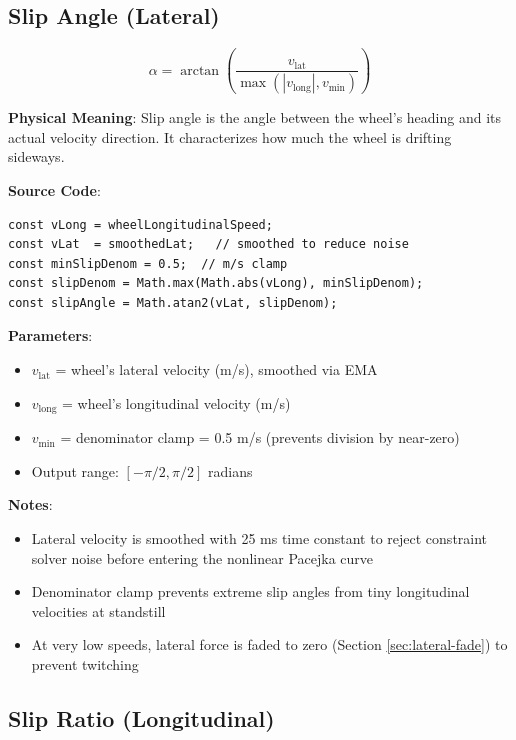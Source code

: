 \subsection{Slip Angle (Lateral)}

\begin{equation}
  \alpha = \arctan\left(\frac{v_{\text{lat}}}{\max(|v_{\text{long}}|, v_{\text{min}})}\right)
  \label{eq:slip-angle}
\end{equation}

\textbf{Physical Meaning}: Slip angle is the angle between the wheel's heading and its actual velocity direction. It characterizes how much the wheel is drifting sideways.

\textbf{Source Code}: 

\begin{lstlisting}[caption={Slip angle computation}]
const vLong = wheelLongitudinalSpeed;
const vLat  = smoothedLat;   // smoothed to reduce noise
const minSlipDenom = 0.5;  // m/s clamp
const slipDenom = Math.max(Math.abs(vLong), minSlipDenom);
const slipAngle = Math.atan2(vLat, slipDenom);
\end{lstlisting}

\textbf{Parameters}:
\begin{itemize}
  \item $v_{\text{lat}}$ = wheel's lateral velocity (m/s), smoothed via EMA
  \item $v_{\text{long}}$ = wheel's longitudinal velocity (m/s)
  \item $v_{\text{min}}$ = denominator clamp = 0.5 m/s (prevents division by near-zero)
  \item Output range: $[-\pi/2, \pi/2]$ radians
\end{itemize}

\textbf{Notes}:
\begin{itemize}
  \item Lateral velocity is smoothed with 25 ms time constant to reject constraint solver noise before entering the nonlinear Pacejka curve
  \item Denominator clamp prevents extreme slip angles from tiny longitudinal velocities at standstill
  \item At very low speeds, lateral force is faded to zero (Section \ref{sec:lateral-fade}) to prevent twitching
\end{itemize}

\subsection{Slip Ratio (Longitudinal)}

